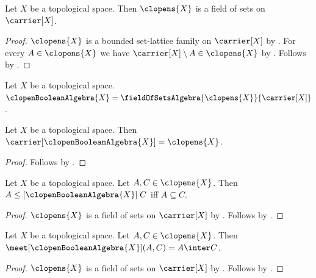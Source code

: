 \begin{classification}\label{clopens_are_field_of_sets}
    Let $X$ be a topological space.
    Then $\clopens{X}$ is a field of sets on $\carrier[X]$.
\end{classification}
\begin{proof}
    $\clopens{X}$ is a bounded set-lattice family on
        $\carrier[X]$ by
        .
    For every $A\in\clopens{X}$ we have
        $\carrier[X]\setminus A\in\clopens{X}$ by
        .
    Follows by .
\end{proof}

\begin{definition}\label{clopen_boolean_algebra}
    Let $X$ be a topological space.
    $\clopenBooleanAlgebra{X}=
        \fieldOfSetsAlgebra{\clopens{X}}{\carrier[X]}$.
\end{definition}

\begin{proposition}\label{clopen_boolean_algebra_carrier}
    Let $X$ be a topological space.
    Then $\carrier[\clopenBooleanAlgebra{X}]=\clopens{X}$.
\end{proposition}
\begin{proof}
    Follows by
        .
\end{proof}

\begin{proposition}\label{clopen_boolean_algebra_order_iff}
    Let $X$ be a topological space.
    Let $A,C\in\clopens{X}$.
    Then $A\mathrel{\leq[\clopenBooleanAlgebra{X}]}C$ iff
        $A\subseteq C$.
\end{proposition}
\begin{proof}
    $\clopens{X}$ is a field of sets on $\carrier[X]$ by
        .
    Follows by
        .
\end{proof}

\begin{proposition}\label{clopen_boolean_algebra_meet_apply}
    Let $X$ be a topological space.
    Let $A,C\in\clopens{X}$.
    Then $\meet[\clopenBooleanAlgebra{X}](A,C)=A\inter C$.
\end{proposition}
\begin{proof}
    $\clopens{X}$ is a field of sets on $\carrier[X]$ by
        .
    Follows by
        .
\end{proof}

